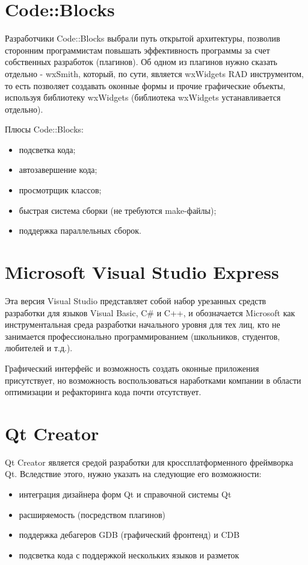 \documentclass[a4paper,14pt]{extreport}
\begin{document}
	\section{Code::Blocks}
	
	Разработчики Code::Blocks выбрали путь открытой архитектуры, позволив сторонним программистам повышать
	эффективность программы за счет собственных разработок (плагинов). Об одном из плагинов
	нужно сказать отдельно - wxSmith, который, по сути, является  wxWidgets
	RAD инструментом, то есть позволяет создавать оконные формы и прочие графические объекты, используя библиотеку wxWidgets (библиотека
	wxWidgets устанавливается отдельно). 
	
	Плюсы Code::Blocks:
	
	 \begin{itemize}
		 \item подсветка кода;
		 \item автозавершение кода;
		 \item просмотрщик классов;
		 \item быстрая система сборки (не требуются make-файлы);
		 \item поддержка параллельных сборок.
	 \end{itemize}
	 
	\section{Microsoft Visual Studio Express}
	
	
	Эта версия Visual Studio представляет собой набор урезанных средств
	разработки для языков Visual Basic, C\# и C++, и обозначается Microsoft как инструментальная среда разработки начального
	уровня для тех лиц, кто не занимается профессионально программированием
	(школьников, студентов, любителей и т.д.).
	
	Графический интерфейс и возможность создать оконные приложения присутствует, но возможность воспользоваться наработками компании в области оптимизации и рефакторинга кода почти отсутствует.
	
	\section{Qt Creator}
	
	Qt Creator является средой разработки для кроссплатформенного фреймворка Qt. Вследствие этого, нужно указать на следующие его возможности:
	\begin{itemize}
		\item интеграция дизайнера форм Qt и справочной системы Qt
		\item расширяемость (посредством плагинов)
		\item поддержка дебагеров GDB (графический фронтенд) и CDB
		\item подсветка кода с поддержкой нескольких языков и разметок
	\end{itemize}
	
\end{document}
